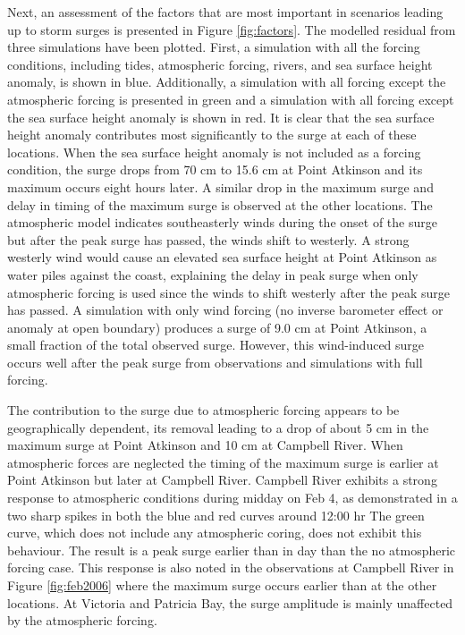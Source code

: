 \documentclass[pdftex,10pt]{article}
\begin{document}
Next, an assessment of the factors that are most important in scenarios leading up to storm surges is presented in Figure \ref{fig:factors}. The modelled residual from three simulations have been plotted. First, a simulation with all the forcing conditions, including tides, atmospheric forcing, rivers, and sea surface height anomaly, is shown in blue. Additionally, a simulation with all forcing except the atmospheric forcing is presented in green and a simulation with all forcing except the sea surface height anomaly is shown in red. It is clear that the sea surface height anomaly contributes most significantly to the surge at each of these locations. When the sea surface height anomaly is not included as a forcing condition, the surge drops from 70 cm to 15.6 cm at Point Atkinson and its maximum occurs eight hours later.  A similar drop in the maximum surge and delay in timing of the maximum surge is observed at the other locations. The atmospheric model indicates southeasterly winds during the onset of the surge but after the peak surge has passed, the winds shift to westerly. A strong westerly wind would cause an elevated sea surface height at Point Atkinson as water piles against the coast, explaining the delay in peak surge when only atmospheric forcing is used since the winds to shift westerly after the peak surge has passed. A simulation with only wind forcing (no inverse barometer effect or anomaly at open boundary) produces a surge of 9.0 cm at Point Atkinson, a small fraction of the total observed surge. However, this wind-induced surge occurs well after the peak surge from observations and simulations with full forcing.

The contribution to the surge due to atmospheric forcing appears to be geographically dependent, its removal leading to a drop of about 5 cm in the maximum surge at Point Atkinson and 10 cm at Campbell River. When atmospheric forces are neglected the timing of the maximum surge is earlier at Point Atkinson but later at Campbell River. Campbell River exhibits a strong response to atmospheric conditions during midday on Feb 4, as demonstrated in a two sharp spikes in both the blue and red curves around 12:00 hr The green curve, which does not include any atmospheric coring, does not exhibit this behaviour. The result is a peak surge earlier than in day than the no atmospheric forcing case. This response is also noted in the observations at Campbell River in Figure \ref{fig:feb2006} where the maximum surge occurs earlier than at the other locations. At Victoria and Patricia Bay, the surge amplitude is mainly unaffected by the atmospheric forcing. 
\end{document}
